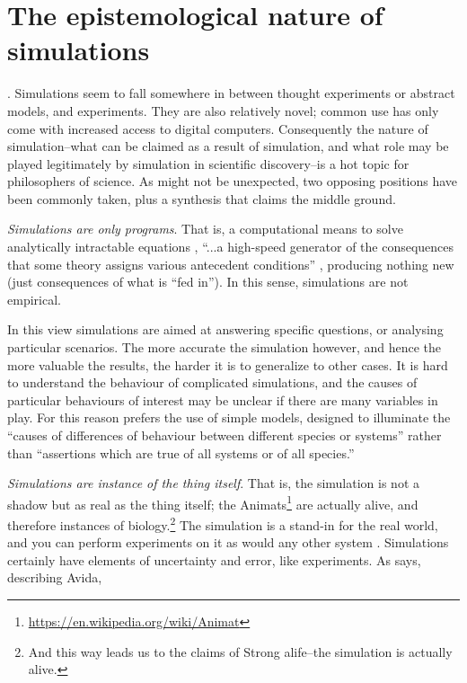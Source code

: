 \section{The epistemological nature of simulations}\label{the-epistemological-nature-of-simulations}. Simulations seem to fall somewhere in between thought experiments or abstract models, and experiments. They are also relatively novel; common use has only come with increased access to digital computers. Consequently the nature of simulation--what can be claimed as a result of simulation, and what role may be played legitimately by simulation in scientific discovery--is a hot topic for philosophers of science. As might not be unexpected, two opposing positions have been commonly taken, plus a synthesis that claims the middle ground.

\emph{Simulations are only programs}. That is, a computational means to solve analytically intractable equations \parencite[31]{Winsberg2010}, ``...a high-speed generator of the consequences that some theory assigns various antecedent conditions'' \parencite[quoting from Dennett]{Eldridge}, producing nothing new (just consequences of what is ``fed in''\parencite{DiPaolo2000}). In this sense, simulations are not empirical.

In this view simulations are aimed at answering specific questions, or analysing particular scenarios. The more accurate the simulation however, and hence the more valuable the results, the harder it is to generalize to other cases. It is hard to understand the behaviour of complicated simulations, and the causes of particular behaviours of interest may be unclear if there are many variables in play. For this reason \parencite{MaynardSmith1974} prefers the use of simple models, designed to illuminate the ``causes of differences of behaviour between different species or systems'' rather than ``assertions which are true of all systems or of all species.''

\emph{Simulations are instance of the thing itself}. That is, the simulation is not a shadow but as real as the thing itself; the Animats\footnote{\url{https://en.wikipedia.org/wiki/Animat}} are actually alive, and therefore instances of biology.\footnote{And this way leads us to the claims of Strong \gls{alife}--the simulation is actually alive.} The simulation is a stand-in for the real world, and you can perform experiments on it as would any other system \parencite[31]{Winsberg2010}. Simulations certainly have elements of uncertainty and error, like experiments. As \textcite{Adami2002} says, describing Avida, 

